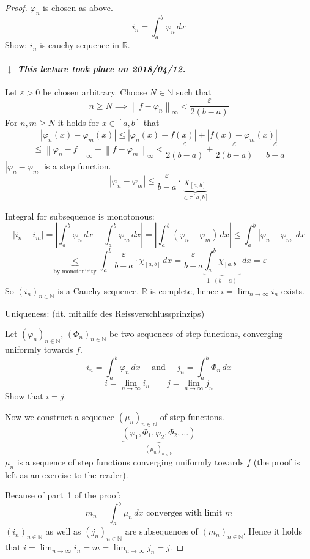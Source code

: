 \documentclass{article}
\newcommand{\norm}[1]{\left\|#1\right\|}
\newcommand{\card}[1]{\left|#1\right|}
\newcommand{\dateref}[1]{%
  \begin{mdframed}[backgroundcolor=gray!10,innerbottommargin=0pt,innertopmargin=0pt]
    \paragraph{\textit{$\downarrow$ This lecture took place on #1.}}%
  \end{mdframed}%
}
\begin{document}
\begin{proof}
  $\varphi_n$ is chosen as above.
  \[ i_n = \int_a^b \varphi_n \, dx \]
  Show: $i_n$ is cauchy sequence in $\mathbb R$.

  \dateref{2018/04/12}

  Let $\varepsilon > 0$ be chosen arbitrary. Choose $N \in \mathbb N$ such that
  \[ n \geq N \implies \norm{f - \varphi_n}_{\infty} < \frac{\varepsilon}{2 (b - a)} \]
  For $n,m \geq N$ it holds for $x \in [a,b]$ that
  \[ \card{\varphi_n(x) - \varphi_m(x)} \leq \card{\varphi_n(x) - f(x)} + \card{f(x) - \varphi_m(x)} \]
  \[
    \leq \norm{\varphi_n - f}_\infty + \norm{f - \varphi_m}_{\infty}
    < \frac{\varepsilon}{2 (b - a)} + \frac{\varepsilon}{2 (b - a)} = \frac{\varepsilon}{b - a}
  \]
  $\card{\varphi_n - \varphi_m}$ is a step function.
  \[ \card{\varphi_n - \varphi_m} \leq \frac{\varepsilon}{b - a} \cdot \underbrace{\chi_{[a,b]}}_{\in \tau[a,b]} \]

  Integral for subsequence is monotonous:
  \[
    \card{i_n - i_m} = \card{\int_a^b \varphi_n \, dx - \int_a^b \varphi_m \, dx}
    = \card{\int_a^b (\varphi_n - \varphi_m) \, dx} \leq \int_a^b \card{\varphi_n - \varphi_m} \, dx
  \] \[
    \underbrace{<}_{\text{by monotonicity}}
    \int_a^b \frac{\varepsilon}{b - a} \cdot \chi_{[a,b]} \, dx
    = \frac{\varepsilon}{b - a} \underbrace{\int_a^b \chi_{[a,b]}}_{1 \cdot (b - a)} \, dx
    = \varepsilon
  \]
  So $(i_n)_{n \in \mathbb N}$ is a Cauchy sequence.
  $\mathbb R$ is complete, hence $i = \lim_{n\to\infty} i_n$ exists.

  Uniqueness: (dt. \foreignlanguage{german}{mithilfe des Reissverschlussprinzips})

  Let $(\varphi_n)_{n \in \mathbb N}$, $(\Phi_n)_{n \in \mathbb N}$ be two sequences of step functions,
  converging uniformly towards $f$.
  \[
    i_n = \int_a^b \varphi_n \, dx \quad \text{ and } \quad j_n = \int_a^b \Phi_n \, dx
  \] \[
    i = \lim_{n\to\infty} i_n \qquad j = \lim_{n\to\infty} j_n
  \]
  Show that $i = j$.

  Now we construct a sequence $(\mu_n)_{n \in \mathbb N}$ of step functions.
  \[ \underbrace{(\varphi_1, \Phi_1, \varphi_2, \Phi_2, \dots)}_{(\mu_n)_{n \in \mathbb N}} \]
  $\mu_n$ is a sequence of step functions converging uniformly towards $f$ (the proof is left as an exercise to the reader).

  Because of part~1 of the proof:
  \[ m_n = \int_a^b \mu_n \, dx \text{ converges with limit } m \]
  $(i_n)_{n\in\mathbb N}$ as well as $(j_n)_{n \in \mathbb N}$ are subsequences of $(m_n)_{n \in \mathbb N}$.
  Hence it holds that $i = \lim_{n\to\infty} i_n = m = \lim_{n\to\infty} j_n = j$.
\end{proof}
\end{document}
